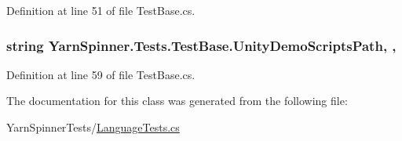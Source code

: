Definition at line 51 of file Test\-Base.\-cs.

\hypertarget{a00170_a39922286f6255e4fd0e433a4fc7521c4}{
\subsubsection[{Unity\-Demo\-Scripts\-Path}]{\setlength{\rightskip}{0pt plus 5cm}string Yarn\-Spinner.\-Tests.\-Test\-Base.\-Unity\-Demo\-Scripts\-Path\hspace{0.3cm}{\ttfamily [static]}, {\ttfamily [get]}, {\ttfamily [inherited]}}}\label{a00170_a39922286f6255e4fd0e433a4fc7521c4}


Definition at line 59 of file Test\-Base.\-cs.



The documentation for this class was generated from the following file\-:\begin{DoxyCompactItemize}
\item 
Yarn\-Spinner\-Tests/\hyperlink{a00329}{Language\-Tests.\-cs}\end{DoxyCompactItemize}
